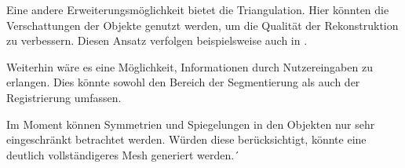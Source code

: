 Eine andere Erweiterungsmöglichkeit bietet die Triangulation.
Hier könnten die Verschattungen der Objekte genutzt werden, um die Qualität der Rekonstruktion zu verbessern.
Diesen Ansatz verfolgen beispielsweise auch \citeauthor{kazhdan2020poisson} in \cite{kazhdan2020poisson}.

Weiterhin wäre es eine Möglichkeit, Informationen durch Nutzereingaben zu erlangen.
Dies könnte sowohl den Bereich der Segmentierung als auch der Registrierung umfassen.

Im Moment können Symmetrien und Spiegelungen in den Objekten nur sehr eingeschränkt betrachtet werden.
Würden diese berücksichtigt, könnte eine deutlich vollständigeres Mesh generiert werden.´


